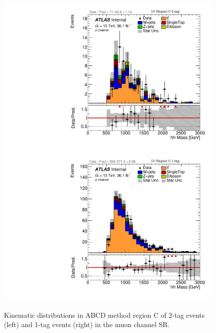 \begin{figure}[!htbp]
\begin{center}
\includegraphics[scale=0.33]{./figures/boosted/ABCD_ScaledPrompt/muon_SR_RegionC_hhMass}       
\includegraphics[scale=0.33]{./figures/boosted/ABCD_ScaledPrompt/muon_SR_RegionC_1tag_hhMass}  
\caption{Kinematic distributions in ABCD method region C of 2-tag events (left) and 1-tag events (right) in the muon channel SR.}
\label{fig:boosted_abcd_scaledprompt_region_c_SR_muon}
\end{center}
\end{figure}




